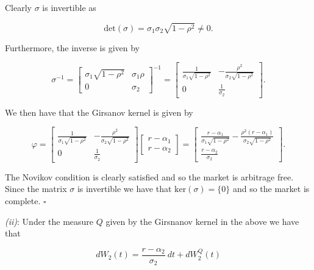 \documentclass[a4paper,12pt,openany]{book}
\begin{document}
Clearly \(\sigma\) is invertible as

\[
\text{det}(\sigma)=\sigma_1\sigma_2\sqrt{1-\rho^2}\ne 0.
\]

Furthermore, the inverse is given by

\[
\sigma^{-1}=\begin{bmatrix}
\sigma_1\sqrt{1-\rho^2} & \sigma_1\rho\\
0&\sigma_2
\end{bmatrix}^{-1}=
\begin{bmatrix}
\frac{1}{\sigma_1\sqrt{1-\rho^2}} & -\frac{\rho^2}{\sigma_2\sqrt{1-\rho^2}}\\
0 & \frac{1}{\sigma_2}
\end{bmatrix}.
\]

We then have that the Girsanov kernel is given by

\[
\varphi=
\begin{bmatrix}
\frac{1}{\sigma_1\sqrt{1-\rho^2}} & -\frac{\rho^2}{\sigma_2\sqrt{1-\rho^2}}\\
0 & \frac{1}{\sigma_2}
\end{bmatrix}
\begin{bmatrix}
r-\alpha_1\\
r-\alpha_2
\end{bmatrix}=
\begin{bmatrix}
\frac{r-\alpha_1}{\sigma_1\sqrt{1-\rho^2}} -\frac{\rho^2(r-\alpha_1)}{\sigma_2\sqrt{1-\rho^2}}\\
\frac{r-\alpha_2}{\sigma_2}
\end{bmatrix}.
\]

The Novikov condition is clearly satisfied and so the market is arbitrage free. Since the matrix \(\sigma\) is invertible we have that \(\text{ker}(\sigma)=\{0\}\) and so the market is complete. \(\square\)

\emph{(ii)}: Under the measure \(Q\) given by the Girsnanov kernel in the above we have that

\[
dW_2(t)=\frac{r-\alpha_2}{\sigma_2}\ dt+dW^Q_2(t)
\]
\end{document}
